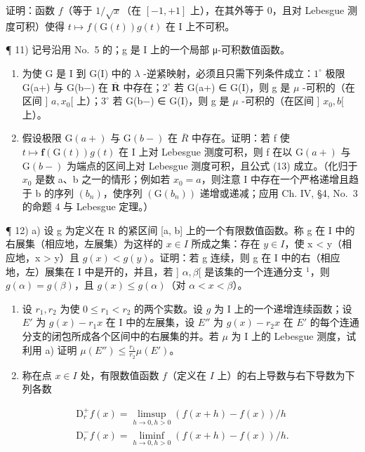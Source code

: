 证明：函数 \(f\)（等于 \(1 / \sqrt{x}\)（在 \([-1, +1]\) 上），在其外等于 0，且对 Lebesgue 测度可积）使得 \(t \mapsto f(\mathrm{G}(t))g(t)\) 在 I 上不可积。

¶ 11) 记号沿用 No.~5 的；g 是 I 上的一个局部 μ-可积数值函数。

\begin{enumerate}
\def\labelenumi{\alph{enumi})}
\item
  为使 G 是 I 到 G(I) 中的 \(\lambda\) -逆紧映射，必须且只需下列条件成立：\(1^{\circ}\) 极限 G(a+) 与 G(b−) 在 \(\overline{\mathbf{R}}\) 中存在；\(2^{\circ}\) 若 G(a+) ∈ G(I)，则 g 是 \(\mu\) -可积的（在区间 {]} \(a, x_0[\) 上）；\(3^{\circ}\) 若 G(b−) ∈ G(I)，则 g 是 \(\mu\) -可积的（在区间 {]} \(x_0, b[\) 上）。
\item
  假设极限 \(\mathrm{G}(a+)\) 与 \(\mathrm{G}(b-)\) 在 \(\overline{R}\) 中存在。证明：若 f 使 \(t \mapsto \mathbf{f}(\mathrm{G}(t))g(t)\) 在 I 上对 Lebesgue 测度可积，则 f 在以 \(\mathrm{G}(a+)\) 与 \(\mathrm{G}(b-)\) 为端点的区间上对 Lebesgue 测度可积，且公式 (13) 成立。（化归于 \(x_{0}\) 是数 a、b 之一的情形；例如若 \(x_{0} = a\)，则注意 I 中存在一个严格递增且趋于 b 的序列 \((b_{n})\)，使序列 \((\mathrm{G}(b_{n}))\) 递增或递减；应用 Ch. IV, §4, No.~3 的命题 4 与 Lebesgue 定理。）
\end{enumerate}

¶ 12) a) 设 g 为定义在 R 的紧区间 {[}a, b{]} 上的一个有限数值函数。称 g 在 I 中的右展集（相应地，左展集）为这样的 \(x \in I\) 所成之集：存在 \(y \in I\)，使 x < y（相应地，x \textgreater{} y）且 \(g(x) < g(y)\)。证明：若 g 连续，则 g 在 I 中的右（相应地，左）展集在 I 中是开的，并且，若 {]} \(\alpha, \beta[\) 是该集的一个连通分支 \(^{1}\)，则 \(g(\alpha) = g(\beta)\)，且 \(g(x) \leqslant g(\alpha)\)（对 \(\alpha < x < \beta\)）。

\begin{enumerate}
\def\labelenumi{\alph{enumi})}
\setcounter{enumi}{1}
\item
  设 \(r_1, r_2\) 为使 \(0 \leqslant r_1 < r_2\) 的两个实数。设 \(g\) 为 I 上的一个递增连续函数；设 \(E'\) 为 \(g(x) - r_1x\) 在 I 中的左展集，设 \(E''\) 为 \(g(x) - r_2x\) 在 \(E'\) 的每个连通分支的闭包所成各个区间中的右展集的并。若 \(\mu\) 为 I 上的 Lebesgue 测度，试利用 a) 证明 \(\mu(E'') \leqslant \frac{r_1}{r_2} \mu(E')\)。
\item
  称在点 \(x \in I\) 处，有限数值函数 \(f\)（定义在 \(I\) 上）的右上导数与右下导数为下列各数
\end{enumerate}

\[
\begin{array}{l} \mathrm{D} _ {r} ^ {+} f (x) = \operatorname * {l i m s u p} _ {h \to 0,   h > 0} \left(f (x + h) - f (x)\right) / h \\ \mathrm{D} _ {r} ^ {-} f (x) = \operatorname * {l i m i n f} _ {h \to 0,   h > 0} \left(f (x + h) - f (x)\right) / h. \end{array}
\]

